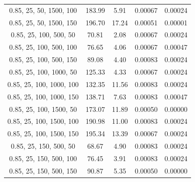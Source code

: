 \documentclass{article}
\begin{document}
\begin{table}[H]
{\begin{tabular}{|c|c|c|c|c|}
                0.85, 25, 50, 1500, 100    & 183.99                 & 5.91                  & 0.00067                  & 0.00024                 \\
                0.85, 25, 50, 1500, 150    & 196.70                 & 17.24                 & 0.00051                  & 0.00001                 \\
                0.85, 25, 100, 500, 50     & 70.81                  & 2.08                  & 0.00067                  & 0.00024                 \\
                0.85, 25, 100, 500, 100    & 76.65                  & 4.06                  & 0.00067                  & 0.00047                 \\
                0.85, 25, 100, 500, 150    & 89.08                  & 4.40                  & 0.00083                  & 0.00024                 \\
                0.85, 25, 100, 1000, 50    & 125.33                 & 4.33                  & 0.00067                  & 0.00024                 \\
                0.85, 25, 100, 1000, 100   & 132.35                 & 11.56                 & 0.00083                  & 0.00024                 \\
                0.85, 25, 100, 1000, 150   & 138.71                 & 7.63                  & 0.00083                  & 0.00047                 \\
                0.85, 25, 100, 1500, 50    & 173.07                 & 11.89                 & 0.00050                  & 0.00000                 \\
                0.85, 25, 100, 1500, 100   & 190.98                 & 11.00                 & 0.00083                  & 0.00024                 \\
                0.85, 25, 100, 1500, 150   & 195.34                 & 13.39                 & 0.00067                  & 0.00024                 \\
                0.85, 25, 150, 500, 50     & 68.67                  & 4.90                  & 0.00083                  & 0.00024                 \\
                0.85, 25, 150, 500, 100    & 76.45                  & 3.91                  & 0.00083                  & 0.00024                 \\
                0.85, 25, 150, 500, 150    & 90.87                  & 5.35                  & 0.00050                  & 0.00000                 \\

\end{tabular}}
\end{table}
\end{document}
